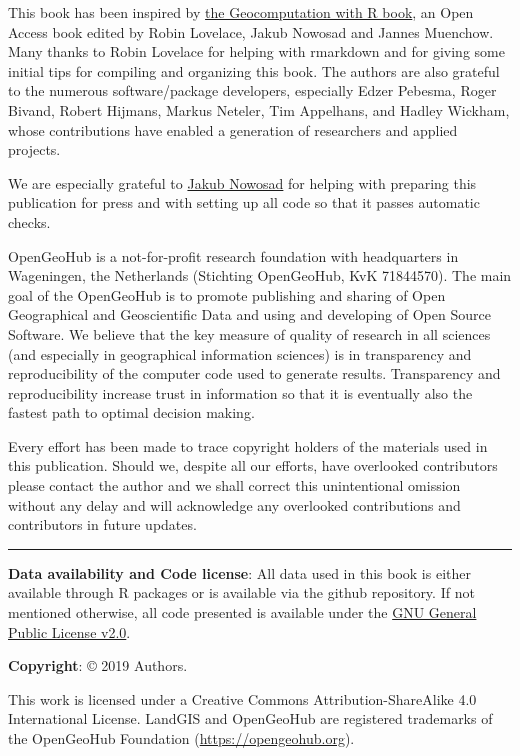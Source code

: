 \documentclass[graybox,natbib,nospthms]{svmono}
\begin{document}
This book has been inspired by
\href{https://geocompr.robinlovelace.net}{the Geocomputation with R
book}, an Open Access book edited by Robin Lovelace, Jakub Nowosad and
Jannes Muenchow. Many thanks to Robin Lovelace for helping with
rmarkdown and for giving some initial tips for compiling and organizing
this book. The authors are also grateful to the numerous
software/package developers, especially Edzer Pebesma, Roger Bivand,
Robert Hijmans, Markus Neteler, Tim Appelhans, and Hadley Wickham, whose
contributions have enabled a generation of researchers and applied
projects.

We are especially grateful to \href{https://nowosad.github.io/}{Jakub
Nowosad} for helping with preparing this publication for press and with
setting up all code so that it passes automatic checks.

OpenGeoHub is a not-for-profit research foundation with headquarters in
Wageningen, the Netherlands (Stichting OpenGeoHub, KvK 71844570). The
main goal of the OpenGeoHub is to promote publishing and sharing of Open
Geographical and Geoscientific Data and using and developing of Open
Source Software. We believe that the key measure of quality of research
in all sciences (and especially in geographical information sciences) is
in transparency and reproducibility of the computer code used to
generate results. Transparency and reproducibility increase trust in
information so that it is eventually also the fastest path to optimal
decision making.

Every effort has been made to trace copyright holders of the materials
used in this publication. Should we, despite all our efforts, have
overlooked contributors please contact the author and we shall correct
this unintentional omission without any delay and will acknowledge any
overlooked contributions and contributors in future updates.

\begin{center}\rule{0.5\linewidth}{\linethickness}\end{center}

\textbf{Data availability and Code license}: All data used in this book
is either available through R packages or is available via the github
repository. If not mentioned otherwise, all code presented is available
under the
\href{https://www.gnu.org/licenses/old-licenses/gpl-2.0.en.html}{GNU
General Public License v2.0}.

\textbf{Copyright}: © 2019 Authors.

This work is licensed under a Creative Commons Attribution-ShareAlike
4.0 International License. LandGIS and OpenGeoHub are registered
trademarks of the OpenGeoHub Foundation (\url{https://opengeohub.org}).
\end{document}
